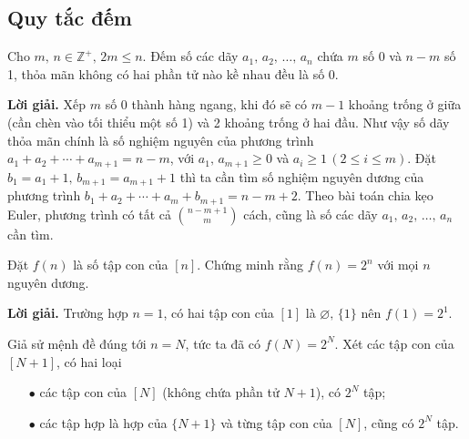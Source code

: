 \subsection{Quy tắc đếm}




\begin{tcolorbox}[breakable]
    \begin{baitoan}\label{pb:w02:02}
        Cho $m,\,n \in \mathbb{Z^+},\,2m \leq n$. Đếm số các dãy $a_1,\,a_2,\,\ldots,\,a_n$ chứa $m$ số 0 và $n-m$ số 1, thỏa mãn không có hai phần tử nào kề nhau đều là số 0.
    \end{baitoan}
\end{tcolorbox}

\textbf{Lời giải. }Xếp $m$ số 0 thành hàng ngang, khi đó sẽ có $m-1$ khoảng trống ở giữa (cần chèn vào tối thiểu một số 1) và 2 khoảng trống ở hai đầu. Như vậy số dãy thỏa mãn chính là số nghiệm nguyên của phương trình $a_1 + a_2 + \cdots + a_{m+1} = n-m$, với $a_1,\,a_{m+1} \geq 0$ và $a_i \geq 1\,(2 \leq i \leq m)$. Đặt $b_1 = a_1 + 1,\,b_{m+1}=a_{m+1}+1$ thì ta cần tìm số nghiệm nguyên dương của phương trình $b_1 + a_2 + \cdots + a_m + b_{m+1} = n - m + 2$. Theo bài toán chia kẹo Euler, phương trình có tất cả $\displaystyle {n-m+1 \choose m}$ cách, cũng là số các dãy $a_1,\,a_2,\,\ldots,\,a_n$ cần tìm.

\begin{tcolorbox}[breakable]
    \begin{baitoan}\label{pb:w02:03}
        Đặt $f(n)$ là số tập con của $[n]$. Chứng minh rằng $f(n) = 2^n$ với mọi $n$ nguyên dương.
    \end{baitoan}
\end{tcolorbox}

\textbf{Lời giải. }Trường hợp $n=1$, có hai tập con của $[1]$ là $\varnothing,\,\{1\}$ nên $f(1) = 2^1$.

Giả sử mệnh đề đúng tới $n = N$, tức ta đã có $f(N) = 2^N$. Xét các tập con của $[N+1]$, có hai loại
\begin{enumerate}
    \item[$\bullet$] các tập con của $[N]$ (không chứa phần tử $N+1$), có $2^N$ tập;
    \item[$\bullet$] các tập hợp là hợp của $\{N+1\}$ và từng tập con của $[N]$, cũng có $2^N$ tập.
\end{enumerate}


